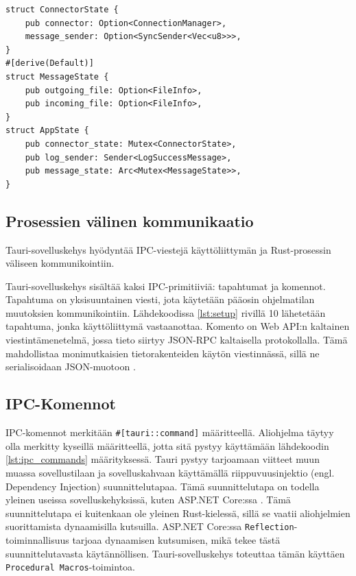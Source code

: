 \documentclass[a4paper,12pt]{article}
\begin{document}
    
    \begin{lstlisting}[caption={Sovellustilan rakenne.}, label={lst:app_state}]
struct ConnectorState {
    pub connector: Option<ConnectionManager>,
    message_sender: Option<SyncSender<Vec<u8>>>,
}
#[derive(Default)]
struct MessageState {
    pub outgoing_file: Option<FileInfo>,
    pub incoming_file: Option<FileInfo>,
}
struct AppState {
    pub connector_state: Mutex<ConnectorState>,
    pub log_sender: Sender<LogSuccessMessage>,
    pub message_state: Arc<Mutex<MessageState>>,
}\end{lstlisting}

    \subsection{Prosessien välinen kommunikaatio}
    Tauri-sovelluskehys hyödyntää IPC-viestejä käyttöliittymän ja Rust-prosessin väliseen kommunikointiin.

    Tauri-sovelluskehys sisältää kaksi IPC-primitiiviä: tapahtumat ja komennot.
    Tapahtuma on yksisuuntainen viesti, jota käytetään pääosin ohjelmatilan muutoksien kommunikointiin. Lähdekoodissa \ref{lst:setup} rivillä 10 lähetetään tapahtuma, jonka käyttöliittymä vastaanottaa. Komento on Web API:n kaltainen viestintämenetelmä, jossa tieto siirtyy JSON-RPC kaltaisella protokollalla. Tämä mahdollistaa monimutkaisien tietorakenteiden käytön viestinnässä, sillä ne serialisoidaan JSON-muotoon \cite{tauri-app}.

    \subsection{IPC-Komennot}
    IPC-komennot merkitään \lstinline{#[tauri::command]} määritteellä. Aliohjelma täytyy olla merkitty kyseillä määritteellä, jotta sitä pystyy käyttämään lähdekoodin \ref{lst:ipc_commands} määrityksessä. Tauri pystyy tarjoamaan viitteet muun muassa sovellustilaan ja sovelluskahvaan käyttämällä riippuvuusinjektio (engl. Dependency Injection) suunnittelutapaa. Tämä suunnittelutapa on todella yleinen useissa sovelluskehyksissä, kuten ASP.NET Core:ssa \cite{DI_dotnet}. Tämä suunnittelutapa ei kuitenkaan ole yleinen Rust-kielessä, sillä se vaatii aliohjelmien suorittamista dynaamisilla kutsuilla.
    ASP.NET Core:ssa \lstinline{Reflection}-toiminnallisuus tarjoaa dynaamisen kutsumisen, mikä tekee tästä suunnittelutavasta käytännöllisen.
    Tauri-sovelluskehys toteuttaa tämän käyttäen \\ \lstinline{Procedural Macros}-toimintoa. 
\end{document}
